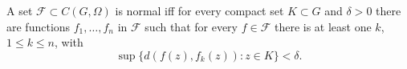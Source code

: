 A set $\mathcal{F} \subset C(G, \Omega)$ is normal iff for every compact set $K \subset G$ and $\delta > 0$ there are functions $f_1, \ldots, f_n$ in $\mathcal{F}$ such that for every $f \in \mathcal{F}$ there is at least one $k$, $1 \leq k \leq n$, with
$$\sup \{d(f(z), f_k(z)) : z \in K\} < \delta.$$
